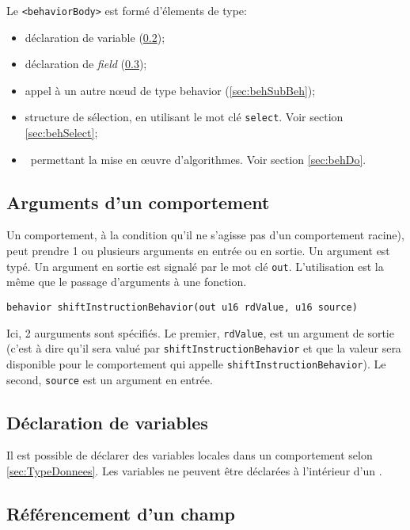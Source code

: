 Le {\tt <behaviorBody>} est formé d'élements de type:
\begin{itemize}
\item déclaration de variable (\ref{sec:behVar});
\item déclaration de {\em field} (\ref{sec:behField});
\item appel à un autre nœud de type behavior (\ref{sec:behSubBeh});
\item structure de sélection, en utilisant le mot clé \texttt{select}. Voir section \ref{sec:behSelect};
\item \blocsdo\ permettant la mise en œuvre d'algorithmes. Voir section \ref{sec:behDo}.
\end{itemize}

\subsection{Arguments d'un comportement}

Un comportement, à la condition qu'il ne s'agisse pas d'un comportement racine), peut prendre 1 ou plusieurs arguments en entrée ou en sortie. Un argument est typé. Un argument en sortie est signalé par le mot clé {\tt out}. L'utilisation est la même que le passage d'arguments à une fonction.
\begin{lstlisting}
behavior shiftInstructionBehavior(out u16 rdValue, u16 source)\end{lstlisting}
Ici, 2 aurguments sont spécifiés. Le premier, {\tt rdValue}, est un argument de sortie (c'est à dire qu'il sera valué par {\tt shiftInstructionBehavior} et que la valeur sera disponible pour le comportement qui appelle {\tt shiftInstructionBehavior}). Le second, {\tt source} est un argument en entrée.

\subsection{Déclaration de variables}
\label{sec:behVar}

Il est possible de déclarer des variables locales dans un comportement selon \ref{sec:TypeDonnees}. Les variables ne peuvent être déclarées à l'intérieur d'un \blocdo.

\subsection{Référencement d'un champ}
\label{sec:behField}

